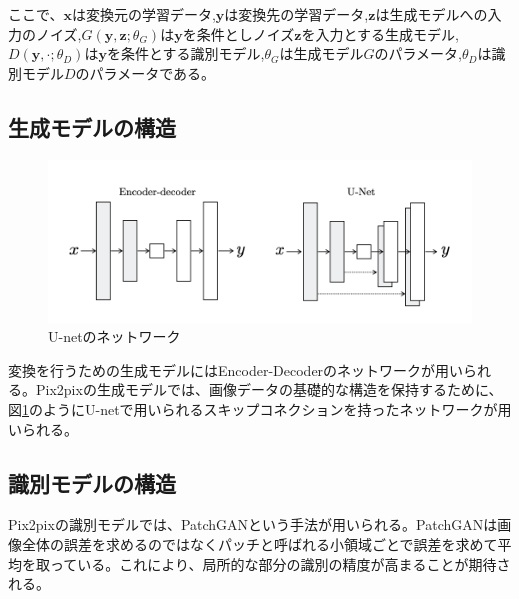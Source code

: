 ここで、$\boldsymbol{x}$は変換元の学習データ,$\boldsymbol{y}$は変換先の学習データ,$\boldsymbol{z}$は生成モデルへの入力のノイズ,$G(\boldsymbol{y},\boldsymbol{z};\theta_G)$は$\boldsymbol{y}$を条件としノイズ$\boldsymbol{z}$を入力とする生成モデル,$D(\boldsymbol{y},\cdot;\theta_D)$は$\boldsymbol{y}$を条件とする識別モデル,$\theta_G$は生成モデル$G$のパラメータ,$\theta_D$は識別モデル$D$のパラメータである。

\subsection{生成モデルの構造}

\begin{figure}[t]
\begin{center}
\includegraphics[width=\hsize]{figure/u-net.png}
\caption{U-netのネットワーク}
\label{fig:u-net}
\end{center}
\end{figure}

変換を行うための生成モデルにはEncoder-Decoderのネットワークが用いられる。Pix2pixの生成モデルでは、画像データの基礎的な構造を保持するために、図\ref{fig:u-net}のようにU-net\cite{u-net}で用いられるスキップコネクションを持ったネットワークが用いられる。

\subsection{識別モデルの構造}

Pix2pixの識別モデルでは、PatchGANという手法が用いられる。PatchGANは画像全体の誤差を求めるのではなくパッチと呼ばれる小領域ごとで誤差を求めて平均を取っている。これにより、局所的な部分の識別の精度が高まることが期待される。

